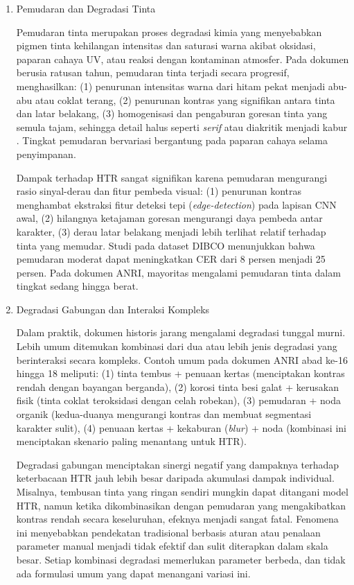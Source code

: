 \begin{enumerate}[leftmargin=*, labelindent=0pt, itemsep=1ex, topsep=0pt]
\item Pemudaran dan Degradasi Tinta
\label{para:pemudaran-tinta}

Pemudaran tinta merupakan proses degradasi kimia yang menyebabkan pigmen tinta kehilangan intensitas dan saturasi warna akibat oksidasi, paparan cahaya UV, atau reaksi dengan kontaminan atmosfer. Pada dokumen berusia ratusan tahun, pemudaran tinta terjadi secara progresif, menghasilkan: (1) penurunan intensitas warna dari hitam pekat menjadi abu-abu atau coklat terang, (2) penurunan kontras yang signifikan antara tinta dan latar belakang, (3) homogenisasi dan pengaburan goresan tinta yang semula tajam, sehingga detail halus seperti \textit{serif} atau diakritik menjadi kabur \parencite{pratikakis2013}. Tingkat pemudaran bervariasi bergantung pada paparan cahaya selama penyimpanan.

Dampak terhadap HTR sangat signifikan karena pemudaran mengurangi rasio sinyal-derau dan fitur pembeda visual: (1) penurunan kontras menghambat ekstraksi fitur deteksi tepi (\textit{edge-detection}) pada lapisan CNN awal, (2) hilangnya ketajaman goresan mengurangi daya pembeda antar karakter, (3) derau latar belakang menjadi lebih terlihat relatif terhadap tinta yang memudar. Studi \parencite{pratikakis2013} pada dataset DIBCO menunjukkan bahwa pemudaran moderat dapat meningkatkan CER dari 8 persen menjadi 25 persen. Pada dokumen ANRI, mayoritas mengalami pemudaran tinta dalam tingkat sedang hingga berat.

\item Degradasi Gabungan dan Interaksi Kompleks
\label{para:degradasi-gabungan}

Dalam praktik, dokumen historis jarang mengalami degradasi tunggal murni. Lebih umum ditemukan kombinasi dari dua atau lebih jenis degradasi yang berinteraksi secara kompleks. Contoh umum pada dokumen ANRI abad ke-16 hingga 18 meliputi: (1) tinta tembus + penuaan kertas (menciptakan kontras rendah dengan bayangan berganda), (2) korosi tinta besi galat + kerusakan fisik (tinta coklat teroksidasi dengan celah robekan), (3) pemudaran + noda organik (kedua-duanya mengurangi kontras dan membuat segmentasi karakter sulit), (4) penuaan kertas + kekaburan (\textit{blur}) + noda (kombinasi ini menciptakan skenario paling menantang untuk HTR).

Degradasi gabungan menciptakan sinergi negatif yang dampaknya terhadap keterbacaan HTR jauh lebih besar daripada akumulasi dampak individual. Misalnya, tembusan tinta yang ringan sendiri mungkin dapat ditangani model HTR, namun ketika dikombinasikan dengan pemudaran yang mengakibatkan kontras rendah secara keseluruhan, efeknya menjadi sangat fatal. Fenomena ini menyebabkan pendekatan tradisional berbasis aturan atau penalaan parameter manual menjadi tidak efektif dan sulit diterapkan dalam skala besar. Setiap kombinasi degradasi memerlukan parameter berbeda, dan tidak ada formulasi umum yang dapat menangani variasi ini.


\end{enumerate}

